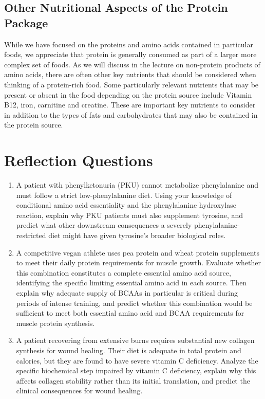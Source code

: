 \documentclass{tufte-handout}
\begin{document}
\subsection{Other Nutritional Aspects of the Protein Package}

While we have focused on the proteins and amino acids contained in particular foods, we appreciate that protein is generally consumed as part of a larger more complex set of foods.  As we will discuss in the lecture on non-protein products of amino acids, there are often other key nutrients that should be considered when thinking of a protein-rich food.  Some particularly relevant nutrients that may be present or absent in the food depending on the protein source include Vitamin B12, iron, carnitine and creatine.  These are important key nutrients to consider in addition to the types of fats and carbohydrates that may also be contained in the protein source. 


\section{Reflection Questions}
\begin{enumerate}
\item A patient with phenylketonuria (PKU) cannot metabolize phenylalanine and must follow a strict low-phenylalanine diet. Using your knowledge of conditional amino acid essentiality and the phenylalanine hydroxylase reaction, explain why PKU patients must also supplement tyrosine, and predict what other downstream consequences a severely phenylalanine-restricted diet might have given tyrosine's broader biological roles.
\item A competitive vegan athlete uses pea protein and wheat protein supplements to meet their daily protein requirements for muscle growth. Evaluate whether this combination constitutes a complete essential amino acid source, identifying the specific limiting essential amino acid in each source. Then explain why adequate supply of BCAAs in particular is critical during periods of intense training, and predict whether this combination would be sufficient to meet both essential amino acid and BCAA requirements for muscle protein synthesis.
\item A patient recovering from extensive burns requires substantial new collagen synthesis for wound healing. Their diet is adequate in total protein and calories, but they are found to have severe vitamin C deficiency. Analyze the specific biochemical step impaired by vitamin C deficiency, explain why this affects collagen stability rather than its initial translation, and predict the clinical consequences for wound healing.
\end{enumerate}



\end{document}
